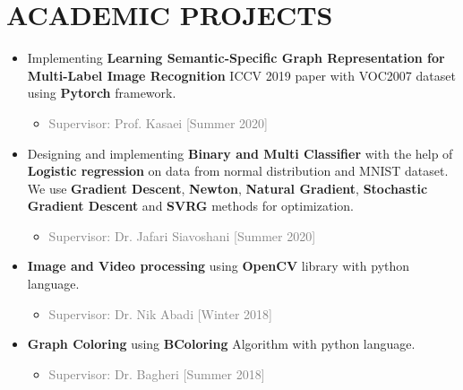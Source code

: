 \documentclass[10pt,a4paper,sans]{moderncv} %
\begin{document}
\section{ACADEMIC PROJECTS}

\begin{itemize}
	
	\item Implementing \textbf{Learning Semantic-Specific Graph Representation for Multi-Label Image Recognition} ICCV 2019 paper with VOC2007 dataset using \textbf{Pytorch} framework.
	\begin{itemize}
		\item \textcolor{gray}{Supervisor: Prof. Kasaei [Summer 2020]}
		\newline
	\end{itemize}
	
	\item Designing and implementing \textbf{Binary and Multi Classifier} with the help of \textbf{Logistic regression} on data from normal distribution and MNIST dataset. We use \textbf{Gradient Descent}, \textbf{Newton}, \textbf{Natural Gradient}, \textbf{Stochastic Gradient Descent} and \textbf{SVRG} methods for optimization.
	\begin{itemize}
		\item \textcolor{gray}{Supervisor: Dr. Jafari Siavoshani [Summer 2020]}
		\newline
	\end{itemize}
	
	\item \textbf{Image and Video processing} using \textbf{OpenCV} library with python language.
	\begin{itemize}
		\item \textcolor{gray}{Supervisor: Dr. Nik Abadi [Winter 2018]}
		\newline
	\end{itemize}

	\item \textbf{Graph Coloring} using \textbf{BColoring} Algorithm with python language.
	\begin{itemize}
		\item \textcolor{gray}{Supervisor: Dr. Bagheri [Summer 2018]}
		\newline
	\end{itemize}


\end{itemize}
\end{document}

